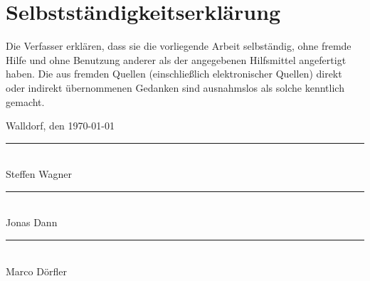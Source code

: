 \newpage
\thispagestyle{empty}
\mbox{}
\newpage
\thispagestyle{empty}
\section*{Selbstständigkeitserklärung}
\vspace{15mm}
 
Die Verfasser erklären, dass sie die vorliegende Arbeit selbständig, 
ohne fremde Hilfe und ohne Benutzung anderer als der angegebenen Hilfsmittel
angefertigt haben. 
Die aus fremden Quellen (einschließlich elektronischer Quellen) direkt oder 
indirekt übernommenen Gedanken sind ausnahmslos als solche kenntlich gemacht. 
 
\vspace{3cm} 
Walldorf, den \today
\vspace{1cm} 	
\begin{multicols}{3}
	\vspace{2cm}
	\rule{5cm}{.1pt}\\
	\vspace{5mm}
	Steffen Wagner
	
	\rule{5cm}{.1pt}\\
	\vspace{5mm}
	Jonas Dann

	\rule{5cm}{.1pt}\\
	\vspace{5mm}
	Marco Dörfler
\end{multicols}

\vspace{5cm}